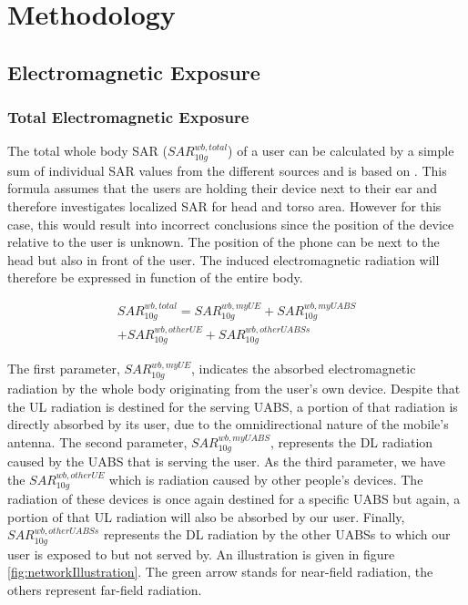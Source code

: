 \documentclass[twocolumn]{phdsymp} %
\begin{document}
\section{Methodology}
\subsection{Electromagnetic Exposure}
\subsubsection{Total Electromagnetic Exposure}
The total whole body SAR ($SAR^{wb,total}_{10g}$) of a user can be calculated by a simple sum of individual SAR values from the different sources
and is based on \cite{J17_kuehn2019modelling}. This formula assumes that the users are holding their device next to their ear and therefore 
investigates localized \gls{SAR} for head and torso area.
However for this case, this would result into incorrect conclusions since 
the position of the device relative to the user is unknown. 
The position of the phone can be next to the head but also in front of the user.
The induced electromagnetic radiation will therefore be expressed in function of the entire body.

\begin{equation} 
\begin{aligned}
SAR^{wb,total}_{10g} = SAR^{wb,myUE}_{10g} +  SAR^{wb,myUABS}_{10g} \\
+ SAR^{wb,otherUE}_{10g} + SAR^{wb,otherUABSs}_{10g}
\end{aligned}
\label{eq:overallSARwb}
\end{equation}

The first parameter, $SAR^{wb,myUE}_{10g}$, indicates the absorbed electromagnetic radiation by the whole body originating from the user's own device. Despite that the 
\gls{UL} radiation is destined for the serving \gls{UABS}, a portion of that radiation is directly absorbed by its user, due to the omnidirectional nature of the mobile's antenna.
The second parameter, $SAR^{wb,myUABS}_{10g}$, represents the \gls{DL} radiation caused by the \gls{UABS} that is serving the user.
As the third parameter, we have the $SAR^{wb,otherUE}_{10g}$ which is radiation caused by other people's devices. The radiation of these devices is once again 
destined for a specific \gls{UABS} but again, a portion of that \gls{UL} radiation will also be absorbed by our user.
Finally, $SAR^{wb,otherUABSs}_{10g}$ represents the \gls{DL} radiation by the other \gls{UABS}s to which our user is exposed to but not served by.
An illustration is given in figure \ref{fig:networkIllustration}.
The green arrow stands for near-field radiation, the others represent far-field radiation.
\end{document}
